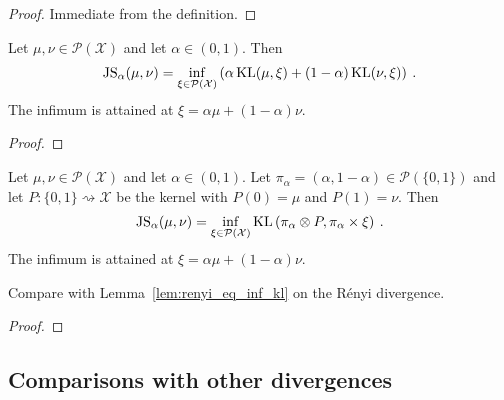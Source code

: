 \begin{proof}%
\uses{}
Immediate from the definition.
\end{proof}


\begin{lemma}
  \label{lem:jensenShannon_eq_inf_add_kl}
  Let $\mu, \nu \in \mathcal P(\mathcal X)$ and let $\alpha \in (0, 1)$. Then
  \begin{align*}
  \operatorname{JS}_\alpha(\mu, \nu) = \inf_{\xi \in \mathcal P(\mathcal X)}\left( \alpha \operatorname{KL}(\mu, \xi) + (1 - \alpha)\operatorname{KL}(\nu, \xi) \right) \: .
  \end{align*}
  The infimum is attained at $\xi = \alpha \mu + (1 - \alpha) \nu$.
\end{lemma}

\begin{proof}%
\uses{}

\end{proof}


\begin{lemma}
  \label{lem:jensenShannon_eq_inf_kl}
  Let $\mu, \nu \in \mathcal P(\mathcal X)$ and let $\alpha \in (0, 1)$. Let $\pi_\alpha = (\alpha, 1 - \alpha) \in \mathcal P(\{0,1\})$ and let $P : \{0,1\} \rightsquigarrow \mathcal X$ be the kernel with $P(0) = \mu$ and $P(1) = \nu$. Then
  \begin{align*}
  \operatorname{JS}_\alpha(\mu, \nu) = \inf_{\xi \in \mathcal P(\mathcal X)} \operatorname{KL}\left( \pi_\alpha \otimes P, \pi_\alpha \times \xi \right) \: .
  \end{align*}
  The infimum is attained at $\xi = \alpha \mu + (1 - \alpha) \nu$.
\end{lemma}

Compare with Lemma~\ref{lem:renyi_eq_inf_kl} on the Rényi divergence.

\begin{proof}%
\uses{}

\end{proof}



\subsection{Comparisons with other divergences}

